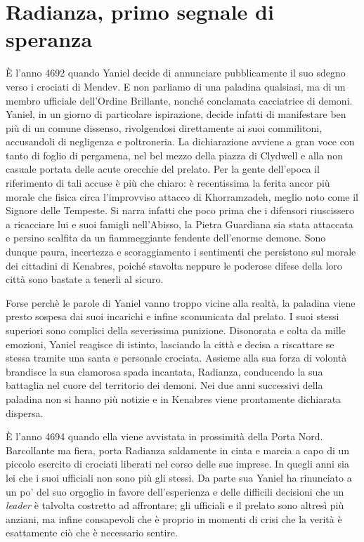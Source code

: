 \chapter{Radianza, primo segnale di speranza}
\label{chp:cap2}

\`E l'anno 4692 quando Yaniel decide di annunciare pubblicamente il suo sdegno verso i crociati di Mendev. E non parliamo di una paladina qualsiasi, ma di un membro ufficiale dell'Ordine Brillante, nonch\'e conclamata cacciatrice di demoni. Yaniel, in un giorno di particolare ispirazione, decide infatti di manifestare ben pi\`u di un comune dissenso, rivolgendosi direttamente ai suoi commilitoni, accusandoli di negligenza e poltroneria. La dichiarazione avviene a gran voce con tanto di foglio di pergamena, nel bel mezzo della piazza di Clydwell e alla non casuale portata delle acute orecchie del prelato. Per la gente dell'epoca il riferimento di tali accuse \`e pi\`u che chiaro: \`e recentissima la ferita ancor pi\`u morale che fisica circa l'improvviso attacco di Khorramzadeh, meglio noto come il Signore delle Tempeste. Si narra infatti che poco prima che i difensori riuscissero a ricacciare lui e suoi famigli nell'Abisso, la Pietra Guardiana sia stata attaccata e persino scalfita da un fiammeggiante fendente dell'enorme demone. Sono dunque paura, incertezza e scoraggiamento i sentimenti che persistono sul morale dei cittadini di Kenabres, poich\'e stavolta neppure le poderose difese della loro citt\`a sono bastate a tenerli al sicuro.

Forse perch\`e le parole di Yaniel vanno troppo vicine alla realt\`a, la paladina viene presto sospesa dai suoi incarichi e infine scomunicata dal prelato. I suoi stessi superiori sono complici della severissima punizione. Disonorata e colta da mille emozioni, Yaniel reagisce di istinto, lasciando la citt\`a e decisa a riscattare se stessa tramite una santa e personale crociata. Assieme alla sua forza di volont\`a brandisce la sua clamorosa spada incantata, Radianza, conducendo la sua battaglia nel cuore del territorio dei demoni. Nei due anni successivi della paladina non si hanno pi\`u notizie e in Kenabres viene prontamente dichiarata dispersa.

\`E l'anno 4694 quando ella viene avvistata in prossimit\`a della Porta Nord. Barcollante ma fiera, porta Radianza saldamente in cinta e marcia a capo di un piccolo esercito di crociati liberati nel corso delle sue imprese. In quegli anni sia lei che i suoi ufficiali non sono pi\`u gli stessi. Da parte sua Yaniel ha rinunciato a un po' del suo orgoglio in favore dell'esperienza e delle difficili decisioni che un \emph{leader} \`e talvolta costretto ad affrontare; gli ufficiali e il prelato sono altres\`i pi\`u anziani, ma infine consapevoli che \`e proprio in momenti di crisi che la verit\`a \`e esattamente ci\`o che \`e necessario sentire.

